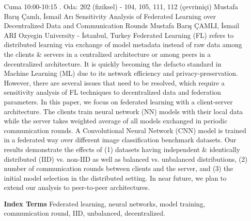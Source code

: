 
    \begin{abstract_basarim}
    {Cuma 10:00-10:15}
    {.}
    {Oda: 202 (fiziksel) - 104, 105, 111, 112 (çevrimiçi)}
    {Mustafa Barış Çamlı, İsmail Arı}
    {Sensitivity Analysis of Federated Learning over Decentralized Data and Communication Rounds}
    {%
    Mustafa Barış ÇAMLI, İsmail ARI}
    {%
    }
    {%
    Ozyegin University - İstanbul, Turkey}
    Federated Learning (FL) refers to distributed learning via exchange of model metadata instead of raw data among the clients & servers in a centralized architecture or among peers in a decentralized architecture. It is quickly becoming the defacto standard in Machine Learning (ML) due to its network efficiency and privacy-preservation. However, there are several issues that need to be resolved, which require a sensitivity analysis of FL techniques to decentralized data and federation parameters. In this paper, we focus on federated learning with a client-server architecture. The clients train neural network (NN) models with their local data while the server takes weighted average of all models exchanged in periodic communication rounds. A Convolutional Neural Network (CNN) model is trained in a federated way over different image classification benchmark datasets. Our results demonstrate the effects of (1) datasets having independent & identically distributed (IID) vs. non-IID as well as balanced vs. unbalanced distributions, (2) number of communication rounds between clients and the server, and (3) the initial model selection in the distributed setting. In near future, we plan to extend our analysis to peer-to-peer architectures. 
    
            \textbf{Index Terms} \newline{}Federated learning, neural networks, model training, communication round, IID, unbalanced, decentralized.
    \end{abstract_basarim}
    